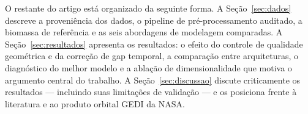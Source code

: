 O restante do artigo está organizado da seguinte forma. A
Seção~\ref{sec:dados} descreve a proveniência dos dados, o pipeline de
pré-processamento auditado, a biomassa de referência e as seis abordagens de
modelagem comparadas. A Seção~\ref{sec:resultados} apresenta os resultados: o
efeito do controle de qualidade geométrica e da correção de gap temporal, a
comparação entre arquiteturas, o diagnóstico do melhor modelo e a ablação de
dimensionalidade que motiva o argumento central do trabalho. A
Seção~\ref{sec:discussao} discute criticamente os resultados --- incluindo suas
limitações de validação --- e os posiciona frente à literatura e ao produto
orbital GEDI da NASA.
